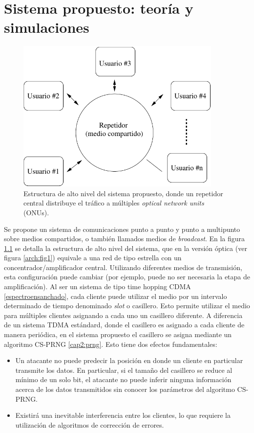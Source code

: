 \chapter{Sistema propuesto: teoría y simulaciones}

\begin{figure}[t]
\centering
\includegraphics[width=4in]{graphs/hub}
\caption{Estructura de alto nivel del sistema propuesto, donde un repetidor central distribuye el tráfico a múltiples \textit{optical network units} (ONUs).}
\label{fig_hub}
\end{figure}

Se propone un sistema de comunicaciones punto a punto y punto a multipunto sobre medios compartidos, o también llamados medios de \textit{broadcast}. En la figura \ref{fig_hub} se detalla la estructura de alto nivel del sistema, que en la versión óptica (ver figura \ref{arch:fig1}) equivale a una red de tipo estrella con un concentrador/amplificador central. Utilizando diferentes medios de transmisión, esta configuración puede cambiar (por ejemplo, puede no ser necesaria la etapa de amplificación).
Al ser un sistema de tipo time hopping CDMA \ref{espectroensanchado}, cada cliente puede utilizar el medio por un intervalo determinado de tiempo denominado \textit{slot} o casillero. Esto permite utilizar el medio para múltiples clientes asignando a cada uno un casillero diferente. A diferencia de un sistema TDMA estándard, donde el casillero es asignado a cada cliente de manera periódica, en el sistema propuesto el casillero se asigna mediante un algoritmo CS-PRNG \ref{cap2:prng}. Esto tiene dos efectos fundamentales: 

\begin{itemize}
 \item Un atacante no puede predecir la posición en donde un cliente en particular transmite los datos. En particular, si el tamaño del casillero se reduce al mínimo de un solo bit, el atacante no puede inferir ninguna información acerca de los datos transmitidos sin conocer los parámetros del algoritmo CS-PRNG.
 \item Existirá una inevitable interferencia entre los clientes, lo que requiere la utilización de algoritmos de corrección de errores.
\end{itemize}

